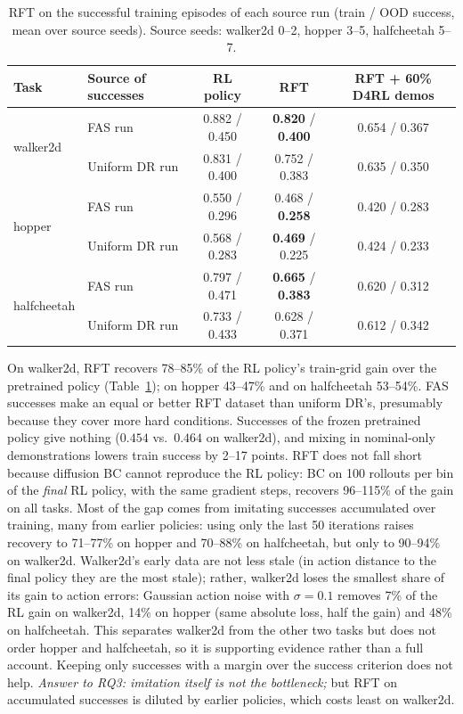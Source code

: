 \documentclass{article}
\newcommand{\fas}{\textsc{FAS}}
\begin{document}
\begin{table}[t]
\centering
\caption{RFT on the successful training episodes of each source run (train / OOD success, mean over source seeds). Source seeds: walker2d 0--2, hopper 3--5, halfcheetah 5--7.}
\label{tab:rft}
\small
\begin{tabular}{llccc}
\toprule
Task & Source of successes & RL policy & RFT & RFT + 60\% D4RL demos \\
\midrule
\multirow{2}{*}{walker2d} & \fas{} run & 0.882 / 0.450 & \textbf{0.820} / \textbf{0.400} & 0.654 / 0.367 \\
& Uniform DR run & 0.831 / 0.400 & 0.752 / 0.383 & 0.635 / 0.350 \\
\midrule
\multirow{2}{*}{hopper} & \fas{} run & 0.550 / 0.296 & 0.468 / \textbf{0.258} & 0.420 / 0.283 \\
& Uniform DR run & 0.568 / 0.283 & \textbf{0.469} / 0.225 & 0.424 / 0.233 \\
\midrule
\multirow{2}{*}{halfcheetah} & \fas{} run & 0.797 / 0.471 & \textbf{0.665} / \textbf{0.383} & 0.620 / 0.312 \\
& Uniform DR run & 0.733 / 0.433 & 0.628 / 0.371 & 0.612 / 0.342 \\
\bottomrule
\end{tabular}
\end{table}

On walker2d, RFT recovers 78--85\% of the RL policy's train-grid gain over the pretrained policy (Table~\ref{tab:rft}); on hopper 43--47\% and on halfcheetah 53--54\%.
\fas{} successes make an equal or better RFT dataset than uniform DR's, presumably because they cover more hard conditions. Successes of the frozen pretrained policy give nothing ($0.454$ vs.\ $0.464$ on walker2d), and mixing in nominal-only demonstrations lowers train success by 2--17 points.
RFT does not fall short because diffusion BC cannot reproduce the RL policy: BC on 100 rollouts per bin of the \emph{final} RL policy, with the same gradient steps, recovers 96--115\% of the gain on all tasks. Most of the gap comes from imitating successes accumulated over training, many from earlier policies: using only the last 50 iterations raises recovery to 71--77\% on hopper and 70--88\% on halfcheetah, but only to 90--94\% on walker2d. Walker2d's early data are not less stale (in action distance to the final policy they are the most stale); rather, walker2d loses the smallest share of its gain to action errors: Gaussian action noise with $\sigma=0.1$ removes 7\% of the RL gain on walker2d, 14\% on hopper (same absolute loss, half the gain) and 48\% on halfcheetah. This separates walker2d from the other two tasks but does not order hopper and halfcheetah, so it is supporting evidence rather than a full account. Keeping only successes with a margin over the success criterion does not help.
\emph{Answer to RQ3: imitation itself is not the bottleneck;} but RFT on accumulated successes is diluted by earlier policies, which costs least on walker2d.
\end{document}
